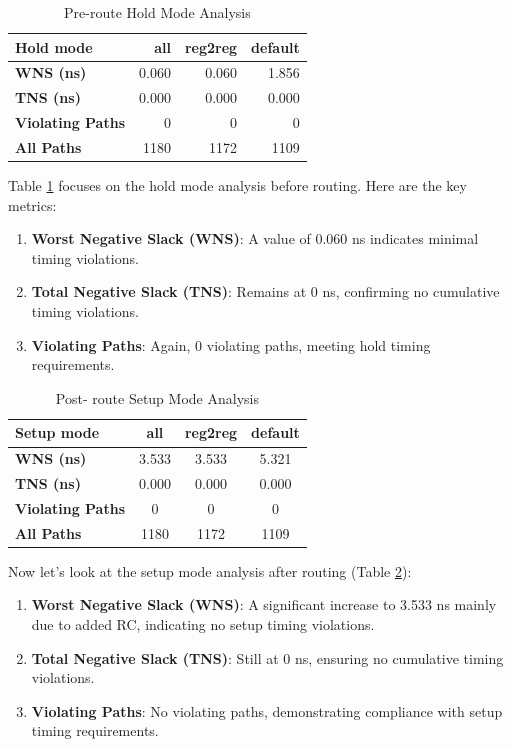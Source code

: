 \begin{table}[H]
\centering
\caption{Pre-route Hold Mode Analysis}
\begin{tabular}{|l|r|r|r|}
\hline
\textbf{Hold mode} & \textbf{all} & \textbf{reg2reg} & \textbf{default} \\ \hline
\textbf{WNS (ns)} & 0.060 & 0.060 & 1.856 \\ \hline
\textbf{TNS (ns)} & 0.000 & 0.000 & 0.000 \\ \hline
\textbf{Violating Paths} & 0 & 0 & 0 \\ \hline
\textbf{All Paths} & 1180 & 1172 & 1109 \\ \hline
\end{tabular}
\label{table:pre_hold_analysis}
\end{table}
Table \ref{table:pre_hold_analysis} focuses on the hold mode analysis before routing. Here are the key metrics:
\begin{enumerate}
    \item \textbf{Worst Negative Slack (WNS)}: A value of 0.060 ns indicates minimal timing violations.
    \item \textbf{Total Negative Slack (TNS)}: Remains at 0 ns, confirming no cumulative timing violations.
    \item \textbf{Violating Paths}: Again, 0 violating paths, meeting hold timing requirements.
\end{enumerate}
\begin{table}[H]
\centering
\caption{Post- route Setup Mode Analysis}
\begin{tabular}{|l|c|c|c|}
\hline
\textbf{Setup mode} & \textbf{all} & \textbf{reg2reg} & \textbf{default} \\
\hline
\textbf{WNS (ns)} & 3.533 & 3.533 & 5.321 \\ \hline
\textbf{TNS (ns)} & 0.000 & 0.000 & 0.000 \\ \hline
\textbf{Violating Paths} & 0 & 0 & 0 \\ \hline
\textbf{All Paths} & 1180 & 1172 & 1109 \\ \hline
\end{tabular}
\label{table:post_setup_mode_analysis}
\end{table}
Now let’s look at the setup mode analysis after routing (Table \ref{table:post_setup_mode_analysis}):
\begin{enumerate}
    \item \textbf{Worst Negative Slack (WNS)}: A significant increase to 3.533 ns mainly due to added RC, indicating no setup timing violations.
    \item \textbf{Total Negative Slack (TNS)}: Still at 0 ns, ensuring no cumulative timing violations.
    \item \textbf{Violating Paths}: No violating paths, demonstrating compliance with setup timing requirements.
\end{enumerate}


